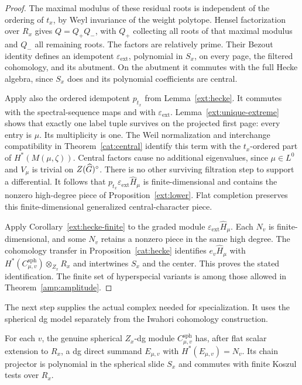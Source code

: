 \begin{proof}
 The maximal modulus of these residual roots is independent of
 the ordering of $t_x$, by Weyl invariance of the weight polytope.
 Hensel factorization over $R_x$ gives
 $Q=Q_+Q_-$, with $Q_+$ collecting all roots of that maximal modulus
 and $Q_-$ all remaining roots.  The factors are relatively prime.
 Their Bezout identity defines an idempotent
 $\varepsilon_{\mathrm{ext}}$, polynomial in $S_x$, on every page,
 the filtered cohomology, and its abutment.  On the abutment it
 commutes with the full Hecke algebra, since $S_x$ does and its
 polynomial coefficients are central.

 Apply also the ordered idempotent $p_{t_x}$ from
 Lemma~\ref{ext:hecke}.  It commutes with the spectral-sequence
 maps and with $\varepsilon_{\mathrm{ext}}$.
 Lemma~\ref{ext:unique-extreme} shows that exactly one label tuple
 survives on the projected first page: every entry is $\mu$.
 Its multiplicity is one.  The Weil normalization and interchange
 compatibility in Theorem~\ref{cat:central} identify this term with
 the $t_x$-ordered part of $H^*(M(\mu,\zeta))$.
 Central factors cause no additional eigenvalues, since
 $\mu\in L^0$ and $V_\mu$ is trivial on $Z(\widehat G)^\circ$.
 There is no other surviving filtration step to support a
 differential.  It follows that
 $p_{t_x}\varepsilon_{\mathrm{ext}}\widehat H_\mu$ is
 finite-dimensional and contains the nonzero high-degree piece
 of Proposition~\ref{ext:lower}.  Flat completion preserves this
 finite-dimensional generalized central-character piece.

 Apply Corollary~\ref{ext:hecke-finite} to the graded module
 $\varepsilon_{\mathrm{ext}}\widehat H_\mu$.
 Each $N_v$ is finite-dimensional, and some $N_v$ retains a nonzero
 piece in the same high degree.  The cohomology transfer in
 Proposition~\ref{cat:hecke} identifies
 $e_v\widehat H_\mu$ with
 $H^*(C_{\mu,v}^{\mathrm{sph}})\otimes_{Z_x}R_x$ and intertwines
 $S_x$ and the center.  This proves the stated identification.
 The finite set of hyperspecial variants is among those allowed
 in Theorem~\ref{amp:amplitude}.
\end{proof}

The next step supplies the actual complex needed for specialization.
It uses the spherical dg model separately from the Iwahori
cohomology construction.

\begin{proposition}\label{ext:spherical-projector}
 For each $v$, the genuine spherical $Z_x$-dg module
 $C_{\mu,v}^{\mathrm{sph}}$ has, after flat scalar extension to
 $R_x$, a dg direct summand $E_{\mu,v}$ with
 $H^*(E_{\mu,v})=N_v$.  Its chain projector is polynomial in the
 spherical slide $S_x$ and commutes with finite Koszul tests over
 $R_x$.
\end{proposition}

